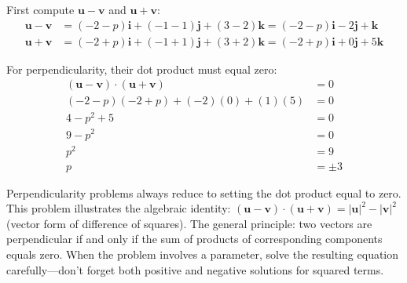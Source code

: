 \begin{solution}
First compute $\mathbf{u} - \mathbf{v}$ and $\mathbf{u} + \mathbf{v}$:
\vspace{-2mm}
\begin{align*}
\mathbf{u} - \mathbf{v} &= (-2-p)\mathbf{i} + (-1-1)\mathbf{j} + (3-2)\mathbf{k} = (-2-p)\mathbf{i} - 2\mathbf{j} + \mathbf{k}\\
\mathbf{u} + \mathbf{v} &= (-2+p)\mathbf{i} + (-1+1)\mathbf{j} + (3+2)\mathbf{k} = (-2+p)\mathbf{i} + 0\mathbf{j} + 5\mathbf{k}
\end{align*}
\vspace{-2mm}

For perpendicularity, their dot product must equal zero:
\vspace{-2mm}
\begin{align*}
(\mathbf{u} - \mathbf{v}) \cdot (\mathbf{u} + \mathbf{v}) &= 0\\
(-2-p)(-2+p) + (-2)(0) + (1)(5) &= 0\\
4 - p^2 + 5 &= 0\\
9 - p^2 &= 0\\
p^2 &= 9\\
p &= \pm 3
\end{align*}
\end{solution}

\begin{takeaways}
Perpendicularity problems always reduce to setting the dot product equal to zero. This problem illustrates the algebraic identity: $(\mathbf{u} - \mathbf{v}) \cdot (\mathbf{u} + \mathbf{v}) = |\mathbf{u}|^2 - |\mathbf{v}|^2$ (vector form of difference of squares). The general principle: two vectors are perpendicular if and only if the sum of products of corresponding components equals zero. When the problem involves a parameter, solve the resulting equation carefully—don't forget both positive and negative solutions for squared terms.
\end{takeaways}

\vspace{1em}
